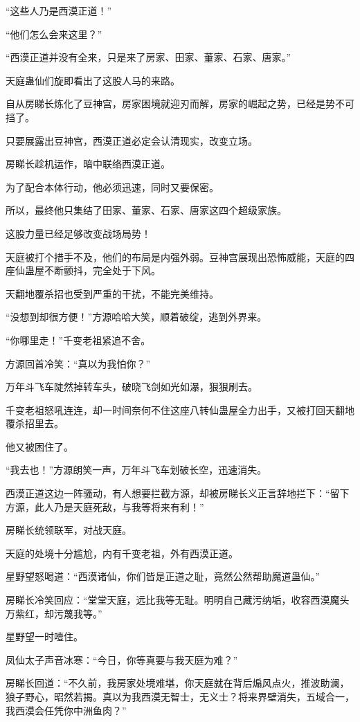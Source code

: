 \begin{this_body}
“这些人乃是西漠正道！”

“他们怎么会来这里？”

“西漠正道并没有全来，只是来了房家、田家、董家、石家、唐家。”

天庭蛊仙们旋即看出了这股人马的来路。

自从房睇长炼化了豆神宫，房家困境就迎刃而解，房家的崛起之势，已经是势不可挡了。

只要展露出豆神宫，西漠正道必定会认清现实，改变立场。

房睇长趁机运作，暗中联络西漠正道。

为了配合本体行动，他必须迅速，同时又要保密。

所以，最终他只集结了田家、董家、石家、唐家这四个超级家族。

这股力量已经足够改变战场局势！

天庭被打个措手不及，他们的布局是内强外弱。豆神宫展现出恐怖威能，天庭的四座仙蛊屋不断颤抖，完全处于下风。

天翻地覆杀招也受到严重的干扰，不能完美维持。

“没想到却很方便！”方源哈哈大笑，顺着破绽，逃到外界来。

“你哪里走！”千变老祖紧追不舍。

方源回首冷笑：“真以为我怕你？”

万年斗飞车陡然掉转车头，破晓飞剑如光如瀑，狠狠刷去。

千变老祖怒吼连连，却一时间奈何不住这座八转仙蛊屋全力出手，又被打回天翻地覆杀招里去。

他又被困住了。

“我去也！”方源朗笑一声，万年斗飞车划破长空，迅速消失。

西漠正道这边一阵骚动，有人想要拦截方源，却被房睇长义正言辞地拦下：“留下方源，此人乃是天庭死敌，与我等将来有利！”

房睇长统领联军，对战天庭。

天庭的处境十分尴尬，内有千变老祖，外有西漠正道。

星野望怒喝道：“西漠诸仙，你们皆是正道之耻，竟然公然帮助魔道蛊仙。”

房睇长冷笑回应：“堂堂天庭，远比我等无耻。明明自己藏污纳垢，收容西漠魔头万紫红，却污蔑我等。”

星野望一时噎住。

凤仙太子声音冰寒：“今日，你等真要与我天庭为难？”

房睇长回道：“不久前，我房家处境难堪，你天庭就在背后煽风点火，推波助澜，狼子野心，昭然若揭。真以为我西漠无智士，无义士？将来界壁消失，五域合一，我西漠会任凭你中洲鱼肉？”


\end{this_body}
